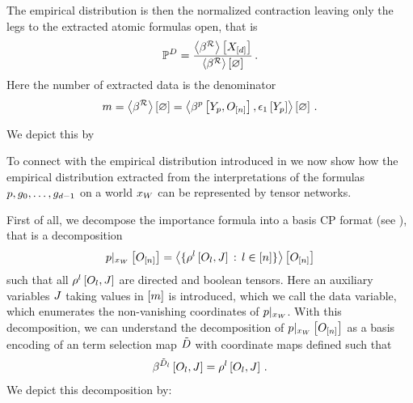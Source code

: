 The empirical distribution is then the normalized contraction leaving only the legs to the extracted atomic formulas open, that is
\begin{align*}
    \mathbb{P}^{D}
    = \frac{
        \left\langle \beta^{\mathcal{R}}\right\rangle \left[ X_{[d]} \right]
    }{
        \left\langle \beta^{\mathcal{R}}\right\rangle \left[ \varnothing \right]
    }  \, .
\end{align*}
Here the number of extracted data is the denominator
\begin{align*}
    m
    = \left\langle \beta^{\mathcal{R}}\right\rangle \left[ \varnothing \right]
    = \left\langle \beta^{p}\left[Y_{p},O_{[n]}\right],\epsilon_1\left[Y_{p}\right]\right\rangle \left[ \varnothing \right]\, .
\end{align*}

We depict this by
\begin{center}
    
\end{center}





To connect with the empirical distribution introduced in  we now show how the empirical distribution extracted from the interpretations of the formulas $p,g_{0},\ldots,g_{d-1}$ on a \firstOrderLogic{} world $x_{W}$ can be represented by tensor networks.

First of all, we decompose the importance formula into a basis CP format (see ), that is a decomposition
\begin{align*}
    {p}|_{x_{W}} \left[O_{[n]}\right]
    = \left\langle 
        \{\rho^{l}\left[O_{l},J\right] \, : \, l\in[n] \}
    \right\rangle \left[ O_{[n]} \right]
\end{align*}
such that all $\rho^{l}\left[O_{l},J\right]$ are directed and boolean tensors.
Here an auxiliary variables $J$ taking values in $[m]$ is introduced, which we call the data variable, which enumerates the non-vanishing coordinates of ${p}|_{x_{W}}$.
With this decomposition, we can understand the decomposition of ${p}|_{x_{W}} \left[O_{[n]}\right]$ as a basis encoding of an term selection map $\tilde{D}$ with coordinate maps defined such that
\begin{align*}
    \beta^{\tilde{D}_{l}}\left[O_{l},J\right]
    = \rho^{l}\left[O_{l},J\right] \, .
\end{align*}
We depict this decomposition by:
\begin{center}
    
\end{center}

